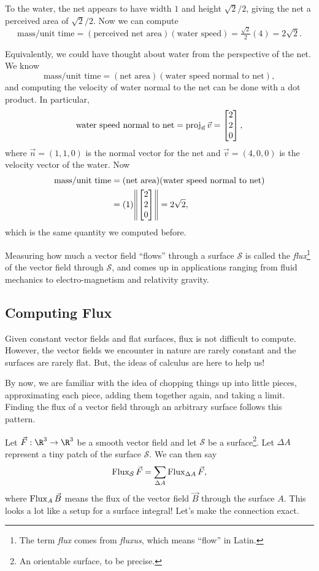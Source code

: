 To the water, the net appears to have width $1$ and height $\sqrt{2}/2$, giving
the net a perceived area of $\sqrt{2}/2$.  Now we can compute
\[
	\text{mass}/\text{unit time} = (\text{perceived net area})
	(\text{water speed}) =\tfrac{\sqrt 2}{2}(4)=2\sqrt{2}.
\]

Equivalently, we could have thought about water from the perspective of the net.
We know
\[
	\text{mass}/\text{unit time} = (\text{net area})
	(\text{water speed normal to net}),
\]
and computing the velocity of water normal to the net can be done with a dot product.
In particular,
\[
	\text{water speed normal to net}=\Proj_{\vec n}\vec v = \mat{2\\2\\0},
\]
where $\vec n=(1,1,0)$ is the normal vector for the net and $\vec v=(4,0,0)$
is the velocity vector of the water.  Now
\begin{align*}
	\text{mass}/\text{unit time} &= (\text{net area})
	(\text{water speed normal to net}) \\
	&= (1)\norm*{\mat{2\\2\\0}}=2\sqrt{2},
\end{align*}
which is the same quantity we computed before.

Measuring how much a vector field ``flows'' through a surface $\mathcal S$
is called the \emph{flux}\footnote{
The term \emph{flux} comes from \emph{fluxus},
which means ``flow'' in Latin.
} of the vector field through $\mathcal S$, and comes up in applications
ranging from fluid mechanics to electro-magnetism and relativity gravity.

\subsection{Computing Flux}

Given constant vector fields and flat surfaces, flux is not difficult to compute.
However, the vector fields we encounter in nature are rarely constant and
the surfaces are rarely flat.  But, the ideas of calculus are here
to help us!

By now, we are familiar with the idea of chopping things up into little pieces,
approximating each piece, adding them together again, and taking a limit.  Finding
the flux of a vector field through an arbitrary surface follows this pattern.

Let $\vec F:\R^3\to\R^3$ be a smooth vector field and let $\mathcal S$ be 
a surface\footnote{ An orientable surface, to be precise.}.
Let $\Delta A$ represent a tiny patch of the surface $\mathcal S$.  We can then say
\[
	\operatorname{Flux}_{\mathcal S} \vec F = \sum_{\Delta A} \operatorname{Flux}_{\Delta A} \vec F,
\]
where $\operatorname{Flux}_A \vec B$ means the flux of the vector field $\vec B$ through the
surface $A$.  This looks a lot like a setup for a surface integral!  Let's make
the connection exact.

